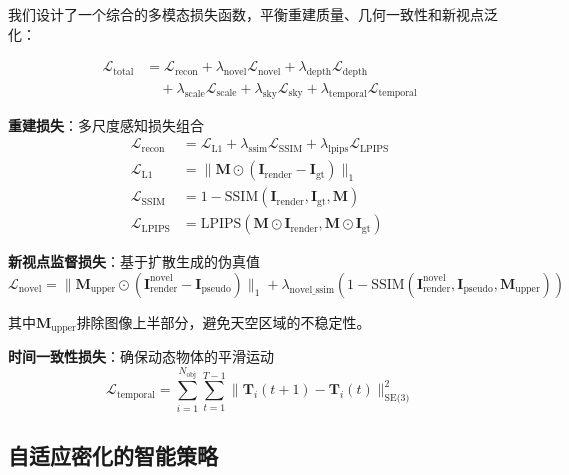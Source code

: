 我们设计了一个综合的多模态损失函数，平衡重建质量、几何一致性和新视点泛化：

\begin{align}
\mathcal{L}_{\text{total}} &= \mathcal{L}_{\text{recon}} + \lambda_{\text{novel}} \mathcal{L}_{\text{novel}} + \lambda_{\text{depth}} \mathcal{L}_{\text{depth}} \\
&\quad + \lambda_{\text{scale}} \mathcal{L}_{\text{scale}} + \lambda_{\text{sky}} \mathcal{L}_{\text{sky}} + \lambda_{\text{temporal}} \mathcal{L}_{\text{temporal}}
\label{eq:comprehensive_loss}
\end{align}

\textbf{重建损失}：多尺度感知损失组合
\begin{align}
\mathcal{L}_{\text{recon}} &= \mathcal{L}_{\text{L1}} + \lambda_{\text{ssim}} \mathcal{L}_{\text{SSIM}} + \lambda_{\text{lpips}} \mathcal{L}_{\text{LPIPS}} \\
\mathcal{L}_{\text{L1}} &= \|\mathbf{M} \odot (\mathbf{I}_{\text{render}} - \mathbf{I}_{\text{gt}})\|_1 \\
\mathcal{L}_{\text{SSIM}} &= 1 - \text{SSIM}(\mathbf{I}_{\text{render}}, \mathbf{I}_{\text{gt}}, \mathbf{M}) \\
\mathcal{L}_{\text{LPIPS}} &= \text{LPIPS}(\mathbf{M} \odot \mathbf{I}_{\text{render}}, \mathbf{M} \odot \mathbf{I}_{\text{gt}})
\label{eq:reconstruction_loss_detailed}
\end{align}

\textbf{新视点监督损失}：基于扩散生成的伪真值
\begin{equation}
\mathcal{L}_{\text{novel}} = \|\mathbf{M}_{\text{upper}} \odot (\mathbf{I}_{\text{render}}^{\text{novel}} - \mathbf{I}_{\text{pseudo}})\|_1 + \lambda_{\text{novel\_ssim}} (1 - \text{SSIM}(\mathbf{I}_{\text{render}}^{\text{novel}}, \mathbf{I}_{\text{pseudo}}, \mathbf{M}_{\text{upper}}))
\label{eq:novel_supervision_loss}
\end{equation}

其中$\mathbf{M}_{\text{upper}}$排除图像上半部分，避免天空区域的不稳定性。

\textbf{时间一致性损失}：确保动态物体的平滑运动
\begin{equation}
\mathcal{L}_{\text{temporal}} = \sum_{i=1}^{N_{\text{obj}}} \sum_{t=1}^{T-1} \|\mathbf{T}_i(t+1) - \mathbf{T}_i(t)\|_{\text{SE(3)}}^2
\label{eq:temporal_consistency}
\end{equation}

\subsection{自适应密化的智能策略}


